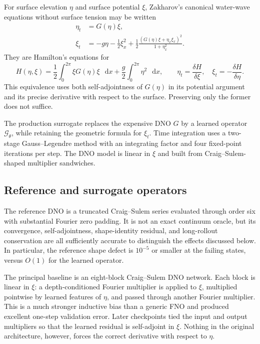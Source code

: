 \documentclass[11pt]{article}
\newcommand{\Gt}{\mathcal{G}_{\theta}}
\newcommand{\dd}{\mathop{}\!\mathrm{d}}
\begin{document}
For surface elevation \(\eta\) and surface potential \(\xi\), Zakharov's
canonical water-wave equations without surface tension may be written
\begin{align}
  \eta_t &= G(\eta)\xi, \\
  \xi_t &= -g\eta
  -\frac{1}{2}\xi_x^2
  +\frac{1}{2}\frac{\left(G(\eta)\xi+\eta_x\xi_x\right)^2}
                         {1+\eta_x^2}.
 \label{eq:zakharov-geometric}
\end{align}
They are Hamilton's equations for
\begin{equation}
 H(\eta,\xi)
 =\frac12\int_0^{2\pi}\xi G(\eta)\xi\,\dd x
  +\frac{g}{2}\int_0^{2\pi}\eta^2\,\dd x,
 \qquad
 \eta_t=\frac{\delta H}{\delta\xi},\quad
 \xi_t=-\frac{\delta H}{\delta\eta}.
 \label{eq:hamiltonian}
\end{equation}
This equivalence uses both self-adjointness of \(G(\eta)\) in its potential
argument and its precise derivative with respect to the surface.  Preserving
only the former does not suffice.

The production surrogate replaces the expensive DNO \(G\) by a learned
operator \(\Gt\), while retaining the geometric formula for \(\xi_t\).  Time
integration uses a two-stage Gauss--Legendre method with an integrating factor
and four fixed-point iterations per step.  The DNO model is linear in \(\xi\)
and built from Craig--Sulem-shaped multiplier sandwiches.

\subsection{Reference and surrogate operators}

The reference DNO is a truncated Craig--Sulem series evaluated through order
six with substantial Fourier zero padding.  It is not an exact continuum
oracle, but its convergence, self-adjointness, shape-identity residual, and
long-rollout conservation are all sufficiently accurate to distinguish the
effects discussed below.  In particular, the reference shape defect is
\(10^{-5}\) or smaller at the failing states, versus \(O(1)\) for the learned
operator.

The principal baseline is an eight-block Craig--Sulem DNO network.  Each block
is linear in \(\xi\): a depth-conditioned Fourier multiplier is applied to
\(\xi\), multiplied pointwise by learned features of \(\eta\), and passed
through another Fourier multiplier.  This is a much stronger inductive bias
than a generic FNO and produced excellent one-step validation error.  Later
checkpoints tied the input and output multipliers so that the learned residual
is self-adjoint in \(\xi\).  Nothing in the original architecture, however,
forces the correct derivative with respect to \(\eta\).
\end{document}
